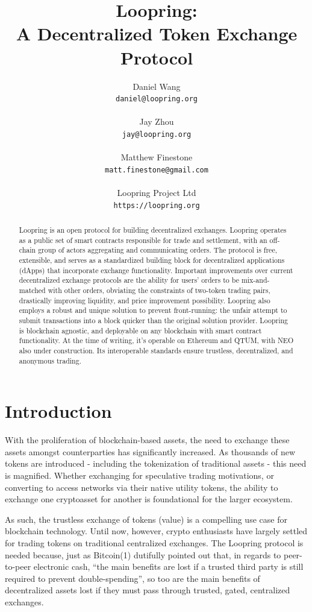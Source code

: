 \documentclass[UTF8,nofonts]{article}
\title{\textbf{Loopring:}\\\textbf{A Decentralized Token Exchange Protocol}}
\author{
  Daniel Wang\\
  \texttt{daniel@loopring.org}\\
  \\
  Jay Zhou\\
  \texttt{jay@loopring.org}\\
  \\
  Matthew Finestone\\
  \texttt{matt.finestone@gmail.com}\\ 
  \\
  Loopring Project Ltd\\
  \texttt{https://loopring.org}
 }
\begin{document}
\maketitle


\begin{abstract}
Loopring is an open protocol for building decentralized exchanges. Loopring operates as a public set of smart contracts responsible for trade and settlement, with an off-chain group of actors aggregating and communicating orders. The protocol is free, extensible, and serves as a standardized building block for decentralized applications (dApps) that incorporate exchange functionality. Important improvements over current decentralized exchange protocols are the ability for users’ orders to be mix-and-matched with other orders, obviating the constraints of two-token trading pairs, drastically improving liquidity, and price improvement possibility. Loopring also employs a robust and unique solution to prevent front-running: the unfair attempt to submit transactions into a block quicker than the original solution provider. Loopring is blockchain agnostic, and deployable on any blockchain with smart contract functionality. At the time of writing, it’s operable on Ethereum and QTUM, with NEO also under construction. Its interoperable standards ensure trustless, decentralized, and anonymous trading. 
\end{abstract}

\newpage

\tableofcontents
\newpage

\section{Introduction\label{sec:introduction}}

With the proliferation of blockchain-based assets, the need to exchange these assets amongst counterparties has significantly increased. As thousands of new tokens are introduced - including the tokenization of traditional assets - this need is magnified. Whether exchanging for speculative trading motivations, or converting to access networks via their native utility tokens, the ability to exchange one cryptoasset for another is foundational for the larger ecosystem.
 
As such, the trustless exchange of tokens (value) is a compelling use case for blockchain technology. Until now, however, crypto enthusiasts have largely settled for trading tokens on traditional centralized exchanges. The Loopring protocol is needed because, just as Bitcoin(1) dutifully pointed out that, in regards to peer-to-peer electronic cash, “the main benefits are lost if a trusted third party is still required to prevent double-spending”, so too are the main benefits of decentralized assets lost if they must pass through trusted, gated, centralized exchanges.
\end{document}
